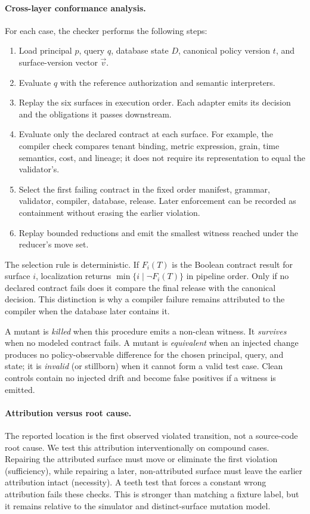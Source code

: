 \paragraph{Cross-layer conformance analysis.}
For each case, the checker performs the following steps:

\begin{enumerate}
  \item Load principal $p$, query $q$, database state $D$, canonical policy version $t$, and surface-version vector $\vec v$.
  \item Evaluate $q$ with the reference authorization and semantic interpreters.
  \item Replay the six surfaces in execution order. Each adapter emits its decision and the obligations it passes downstream.
  \item Evaluate only the declared contract at each surface. For example, the compiler check compares tenant binding, metric expression, grain, time semantics, cost, and lineage; it does not require its representation to equal the validator's.
  \item Select the first failing contract in the fixed order manifest, grammar, validator, compiler, database, release. Later enforcement can be recorded as containment without erasing the earlier violation.
  \item Replay bounded reductions and emit the smallest witness reached under the reducer's move set.
\end{enumerate}

The selection rule is deterministic. If $F_i(T)$ is the Boolean contract result for surface $i$, localization returns $\min\{i\mid \neg F_i(T)\}$ in pipeline order. Only if no declared contract fails does it compare the final release with the canonical decision. This distinction is why a compiler failure remains attributed to the compiler when the database later contains it.

A mutant is \emph{killed} when this procedure emits a non-clean witness. It \emph{survives} when no modeled contract fails. A mutant is \emph{equivalent} when an injected change produces no policy-observable difference for the chosen principal, query, and state; it is \emph{invalid} (or stillborn) when it cannot form a valid test case. Clean controls contain no injected drift and become false positives if a witness is emitted.

\paragraph{Attribution versus root cause.}
The reported location is the first observed violated transition, not a source-code root cause. We test this attribution interventionally on compound cases. Repairing the attributed surface must move or eliminate the first violation (sufficiency), while repairing a later, non-attributed surface must leave the earlier attribution intact (necessity). A teeth test that forces a constant wrong attribution fails these checks. This is stronger than matching a fixture label, but it remains relative to the simulator and distinct-surface mutation model.

